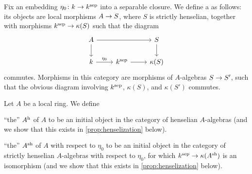 Fix an embedding $\eta_0\colon k\morphism k^\sep$ into a separable closure. We define a  as follows: its objects are local morphisms $A\morphism S$, where $S$ is strictly henselian, together with morphisms $k^\sep\morphism \kappa(S)$ such that the diagram
\begin{equation*}
	\begin{tikzcd}
		A\dar \ar[rr] & & S\dar\\
		k \rar["\eta_0"]&k^\sep\rar & \kappa(S)
	\end{tikzcd}
\end{equation*}
commutes. Morphisms in this category are morphisms of $A$-algebras $S\morphism S'$, such that the obvious diagram involving $k^{\mathrm{sep}}$, $\kappa(S)$, and $\kappa(S')$ commutes.
\begin{defi}\label{def:henselization}
	Let $A$ be a local ring. We define
	\begin{alphanumerate}
		\item \enquote{the}  $A^{\mathrm{h}}$ of $A$ to be an initial object in the category of henselian $A$-algebras (and we show that this exists in \cref{prop:henselization} below).
		\item \enquote{the}  $A^{\mathrm{sh}}$ of $A$ with respect to $\eta_0$ to be an initial object in the category of strictly henselian $A$-algebras with respect to $\eta_0$, for which $k^\sep\morphism \kappa(A^\sh)$ is an isomorphism (and we show that this exists in \cref{prop:henselization} below).
	\end{alphanumerate}
\end{defi}
